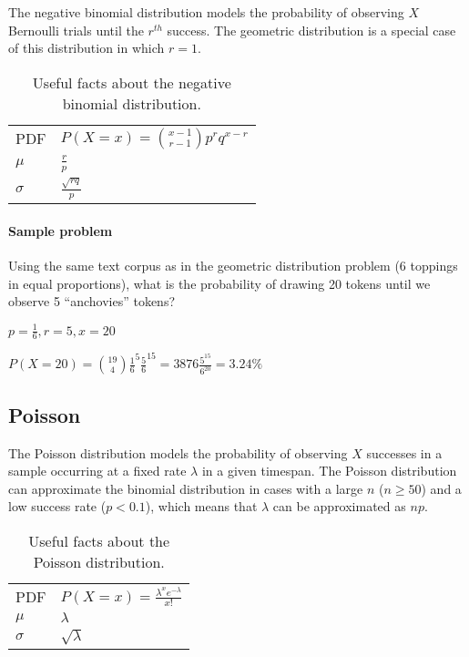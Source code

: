 \documentclass[11pt,letterpaper]{scrartcl}
\begin{document}
The negative binomial distribution models the probability of observing $X$ Bernoulli trials until the $r^{th}$ success.
The geometric distribution is a special case of this distribution in which $r=1$.

\begin{table}[h!]
\centering
\begin{tabular}{l l} \hline
PDF & $P(X=x)= \binom{x-1}{r-1}p^{r}q^{x-r}$ \\
$\mu $ & $\frac{r}{p}$ \\
$\sigma $ & $\frac{\sqrt{rq}}{p}$ \\ \hline
\end{tabular}
\caption{Useful facts about the negative binomial distribution.}
\label{tab:negative_binomial}
\end{table}

\paragraph{Sample problem}

Using the same text corpus as in the geometric distribution problem (6 toppings in equal proportions), what is the probability of drawing 20 tokens until we observe 5 ``anchovies'' tokens?

$p=\frac{1}{6}, r=5, x=20$

$P(X=20) = \binom{19}{4}\frac{1}{6}^{5}\frac{5}{6}^{15} = 3876\frac{5^{15}}{6^{20}} = 3.24\%$

\subsection{Poisson}

The Poisson distribution models the probability of observing $X$ successes in a sample  occurring at a fixed rate $\lambda$ in a given timespan.
The Poisson distribution can approximate the binomial distribution in cases with a large $n$ ($n \geq 50$) and a low success rate ($p < 0.1$), which means that $\lambda$ can be approximated as $np$.

\begin{table}[h!]
\centering
\begin{tabular}{l l} \hline
PDF & $P(X=x)= \frac{\lambda^{x}e^{-\lambda}}{x!}$ \\
$\mu $ & $\lambda$ \\
$\sigma $ & $\sqrt{\lambda}$ \\ \hline
\end{tabular}
\caption{Useful facts about the Poisson distribution.}
\label{tab:poisson}
\end{table}
\end{document}
